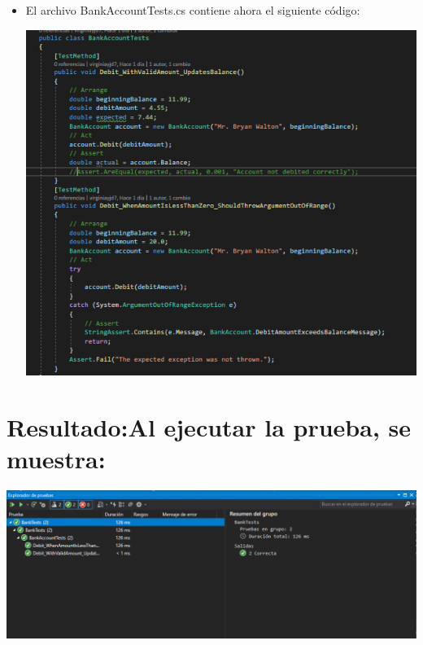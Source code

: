 \begin{itemize}
\begin{center}
\end{center}
\item El archivo BankAccountTests.cs contiene ahora el siguiente código:
\begin{center}
\includegraphics[width=\columnwidth]{images/3}\newline
\end{center}
\end{itemize}
\section{Resultado:Al  ejecutar la prueba, se muestra:} 
\begin{center}
\includegraphics[width=\columnwidth]{images/final}\newline
\end{center}


